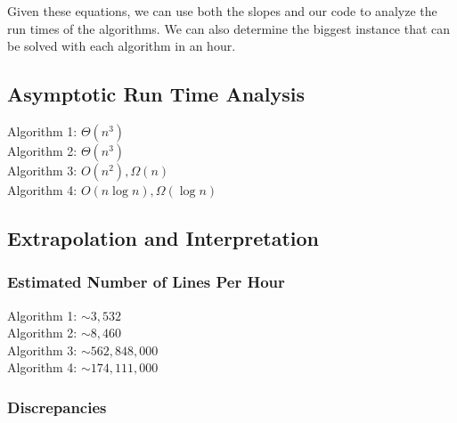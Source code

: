 \documentclass{article}
\begin{document}
Given these equations, we can use both the slopes and our code to analyze the run times of the algorithms. We can also determine the biggest instance that can be solved with each algorithm in an hour.

\subsection*{Asymptotic Run Time Analysis}
Algorithm 1: $\Theta(n^3)$\\
Algorithm 2: $\Theta(n^3)$\\
Algorithm 3: $O(n^2), \Omega(n)$\\
Algorithm 4: $O(n\log n), \Omega(\log n)$\\

\subsection*{Extrapolation and Interpretation}
\subsubsection*{Estimated Number of Lines Per Hour}
Algorithm 1: $\sim 3,532$\\
Algorithm 2: $\sim 8,460$\\
Algorithm 3: $\sim 562,848,000$\\
Algorithm 4: $\sim 174,111,000$

\subsubsection*{Discrepancies}
\end{document}
